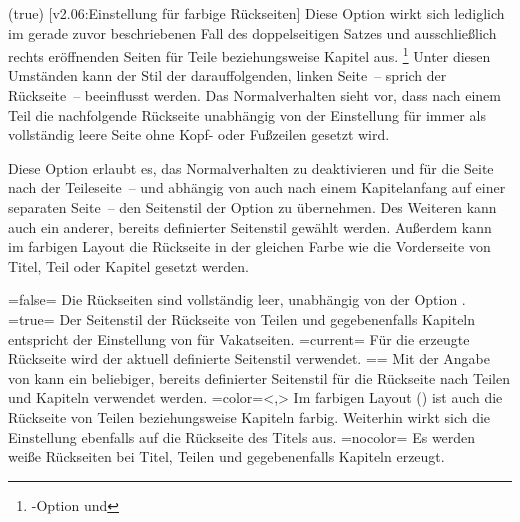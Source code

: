 \begin{DeclareEntity*}{}
\begin{DeclareEntity*}{}
\begin{DeclareEntity*}{}
\begin{Declaration}
  {}
  (true)
  [v2.06:Einstellung für farbige Rückseiten]
Diese Option wirkt sich lediglich im gerade zuvor beschriebenen Fall des 
doppelseitigen Satzes und ausschließlich rechts eröffnenden Seiten für Teile 
beziehungsweise Kapitel aus.%
\footnote{%
  \KOMAScript-Option  und %
}
Unter diesen Umständen kann der Stil der darauffolgenden, linken Seite~-- 
sprich der Rückseite~-- beeinflusst werden. Das Normalverhalten sieht vor, dass 
nach einem Teil die nachfolgende Rückseite unabhängig von der Einstellung für 
 immer als vollständig leere Seite ohne Kopf- oder 
Fußzeilen gesetzt wird.

Diese Option erlaubt es, das Normalverhalten zu deaktivieren und für die Seite 
nach der Teileseite~-- und abhängig von  auch nach einem 
Kapitelanfang auf einer separaten Seite~-- den Seitenstil der Option 
 zu übernehmen. Des Weiteren kann auch ein anderer, 
bereits definierter Seitenstil gewählt werden. Außerdem kann im farbigen Layout 
die Rückseite in der gleichen Farbe wie die Vorderseite von Titel, Teil oder 
Kapitel gesetzt werden. \notudscrartcl
%
\begin{DeclareValues}
\itemval=false=
  Die Rückseiten sind vollständig leer, unabhängig von der Option
  .
\itemval*=true=
  Der Seitenstil der Rückseite von Teilen und gegebenenfalls Kapiteln entspricht
  der Einstellung von  für Vakatseiten.
\itemval=current=
  Für die erzeugte Rückseite wird der aktuell definierte Seitenstil verwendet.
\itemval==
  Mit der Angabe von  
  kann ein beliebiger, bereits definierter Seitenstil für die Rückseite nach 
  Teilen und Kapiteln verwendet werden.
\itemval=color=<,>
  Im farbigen Layout () ist auch die 
  Rückseite von Teilen beziehungsweise Kapiteln farbig. Weiterhin wirkt sich 
  die Einstellung ebenfalls auf die Rückseite des Titels aus.
\itemval=nocolor=
  Es werden weiße Rückseiten bei Titel, Teilen und gegebenenfalls Kapiteln 
  erzeugt.
\end{DeclareValues}
%
\end{Declaration}




\end{DeclareEntity*}
\end{DeclareEntity*}
\end{DeclareEntity*}
